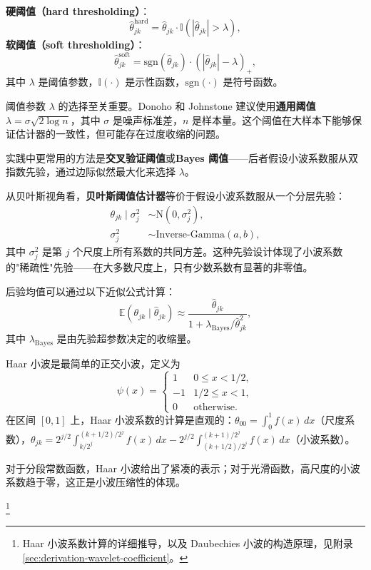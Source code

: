 \textbf{硬阈值（hard thresholding）}：
\begin{equation}
\hat{\theta}_{jk}^{\mathrm{hard}} = \hat{\theta}_{jk} \cdot \mathbb{I}\left(|\hat{\theta}_{jk}| > \lambda\right),
\label{eq:hard-thresholding}
\end{equation}
\textbf{软阈值（soft thresholding）}：
\begin{equation}
\hat{\theta}_{jk}^{\mathrm{soft}} = \mathrm{sgn}(\hat{\theta}_{jk}) \cdot (|\hat{\theta}_{jk}| - \lambda)_+,
\label{eq:soft-thresholding}
\end{equation}
其中 $\lambda$ 是阈值参数，$\mathbb{I}(\cdot)$ 是示性函数，$\mathrm{sgn}(\cdot)$ 是符号函数。

阈值参数 $\lambda$ 的选择至关重要。Donoho 和 Johnstone 建议使用\textbf{通用阈值} $\lambda = \sigma \sqrt{2\log n}$，其中 $\sigma$ 是噪声标准差，$n$ 是样本量。这个阈值在大样本下能够保证估计器的一致性，但可能存在过度收缩的问题。

实践中更常用的方法是\textbf{交叉验证阈值}或\textbf{Bayes 阈值}——后者假设小波系数服从双指数先验，通过边际似然最大化来选择 $\lambda$。

从贝叶斯视角看，\textbf{贝叶斯阈值估计器}等价于假设小波系数服从一个分层先验：
\begin{align}
\theta_{jk} \mid \sigma_j^2 &\sim \mathrm{N}(0, \sigma_j^2), \label{eq:wavelet-hierarchical-prior1} \\
\sigma_j^2 &\sim \text{Inverse-Gamma}(a, b), \label{eq:wavelet-hierarchical-prior2}
\end{align}
其中 $\sigma_j^2$ 是第 $j$ 个尺度上所有系数的共同方差。这种先验设计体现了小波系数的"稀疏性"先验——在大多数尺度上，只有少数系数有显著的非零值。

后验均值可以通过以下近似公式计算：
\begin{equation}
\mathbb{E}(\theta_{jk} \mid \hat{\theta}_{jk}) \approx \frac{\hat{\theta}_{jk}}{1 + \lambda_{\mathrm{Bayes}} / \hat{\theta}_{jk}^2},
\label{eq:wavelet-bayes-estimate}
\end{equation}
其中 $\lambda_{\mathrm{Bayes}}$ 是由先验超参数决定的收缩量。

\begin{Example}\label{ex:haar-wavelet}
Haar 小波是最简单的正交小波，定义为
\begin{equation}
\psi(x) = \begin{cases} 1 & 0 \leq x < 1/2, \\ -1 & 1/2 \leq x < 1, \\ 0 & \text{otherwise}. \end{cases}
\label{eq:haar-wavelet}
\end{equation}
在区间 $[0, 1]$ 上，Haar 小波系数的计算是直观的：$\theta_{00} = \int_0^1 f(x)\, dx$（尺度系数），$\theta_{jk} = 2^{j/2} \int_{k/2^j}^{(k+1/2)/2^j} f(x)\, dx - 2^{j/2} \int_{(k+1/2)/2^j}^{(k+1)/2^j} f(x)\, dx$（小波系数）。

对于分段常数函数，Haar 小波给出了紧凑的表示；对于光滑函数，高尺度的小波系数趋于零，这正是小波压缩性的体现。
\end{Example}
\footnote{Haar 小波系数计算的详细推导，以及 Daubechies 小波的构造原理，见附录 \cref{sec:derivation-wavelet-coefficient}。}

